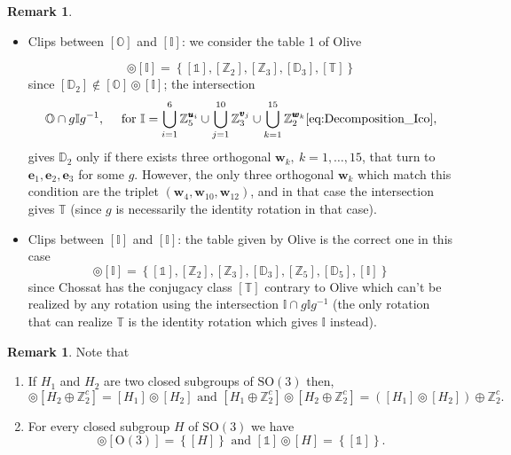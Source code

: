 \documentclass[11pt,a4paper]{amsart}
\theoremstyle{definition}
\newtheorem{rem}[thm]{Remark}
\newcommand{\ZZ}{\mathbb{Z}}                %
\newcommand{\OO}{\mathrm{O}}                %
\newcommand{\SO}{\mathrm{SO}}               %
\newcommand{\octa}{\mathbb{O}}              %
\newcommand{\ico}{\mathbb{I}}               %
\newcommand{\tetra}{\mathbb{T}}             %
\newcommand{\DD}{\mathbb{D}}                %
\newcommand{\1}{\mathds{1}}		            %
\newcommand{\ee}{\pmb{e}}                   %
\newcommand{\uu}{\pmb{u}}                   %
\newcommand{\vv}{\pmb{v}}                   %
\newcommand{\set}[1]{\left\{#1\right\}}     %
\begin{document}
\begin{rem}
\begin{itemize}
     \item Clips between $[\octa]$ and $[\ico]$: we consider the table 1 of Olive \cite{Olive2019}
     
    \begin{equation*}
    	[\octa]\circledcirc[\ico]= \set{[\mathds{1}],[\ZZ_2],[\ZZ_3],[\DD_3],[\tetra]}
    \end{equation*} 
since $[\DD_2]\notin [\octa]\circledcirc [\ico]$; the intersection
     \begin{equation*}
     \octa \cap g\ico g^{-1}, \quad \text{ for } \ico=\bigcup_{i=1}^6 \ZZ_5^{\uu_i} \cup\bigcup_{j=1}^{10} \ZZ_3^{\vv_j}\cup\bigcup_{k=1}^{15}\ZZ_2^{\pmb{w}_k}\eqref{eq:Decomposition_Ico},
     \end{equation*}
     gives $\DD_2$ only if there exists three orthogonal $\pmb{w}_k,\ k=1,\dotsc, 15$, that turn to $\ee_1,\ee_2,\ee_3$ for some $g$. However, the only three orthogonal $\pmb{w}_k$ which match this condition are the triplet $(\pmb{w}_4,\pmb{w}_{10},\pmb{w}_{12})$, and in that case the intersection gives $\tetra$ (since $g$ is necessarily the identity rotation in that case). 
     
     \item Clips between $[\ico]$ and $[\ico]$: the table given by Olive \cite{Olive2019} is the correct one in this case
     \begin{equation*}
  [\ico]\circledcirc[\ico]=\set{[\mathds{1}],[\ZZ_2],[\ZZ_3],[\DD_3],[\ZZ_5],[\DD_5],[\ico]}
     \end{equation*}
     since Chossat has the conjugacy class $[\tetra]$ contrary to Olive which can't be realized by any rotation using the intersection $ \ico\cap g\ico g^{-1}$ (the only rotation that can realize $\tetra$ is the identity rotation which gives $\ico$ instead).

\end{itemize}
\end{rem}



\begin{rem}
  Note that
  \begin{enumerate}
    \item \label{rem:2typeII} If $H_1$ and $H_2$ are two closed subgroups of $\SO(3)$ then,
          \begin{equation*}
            [H_1]\circledcirc [H_2\oplus \ZZ_2^c]=[H_1]\circledcirc [H_2] \text{ and } [H_1\oplus \ZZ_2^c]\circledcirc [H_2\oplus \ZZ_2^c]=([H_1]\circledcirc [H_2])\oplus \ZZ_2^c.
          \end{equation*}
    \item For every closed subgroup $H$ of $\SO(3)$ we have
          \begin{equation*}
            [H]\circledcirc [\OO(3)]=\set{[H]} \text{ and } [\1]\circledcirc [H]=\set{[\1]}.
          \end{equation*}
  \end{enumerate}
\end{rem}
\end{document}
